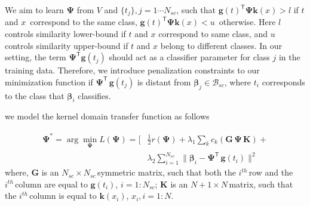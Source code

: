 We aim to learn  $\mathbf{\Psi}$ from $V$ and $\{t_j\}, j=1 \cdots N_{sc}$, such that $\textbf{g}(t)^\textsf{T} \mathbf{\Psi} \textbf{k}(x) > l$ if ${t}$ and  $x\,$ correspond to the same class, $\textbf{g}(t)^\textsf{T} {\mathbf{\Psi}} \textbf{k}(x) < u\,$ otherwise. Here $l\,$ controls similarity lower-bound if $t$ and $x$ correspond to  same class, and $u$ controls similarity upper-bound if $t$ and $x$ belong to different classes. In our setting, the term   ${\mathbf{\Psi}}^\textsf{T} {\textbf{g}(t_j)}$ should act as a classifier parameter for class $j$ in the training data. Therefore,  we introduce  penalization constraints to our minimization function  if  ${\mathbf{\Psi}}^\textsf{T}\,{\textbf{g}(t_j)}$ is distant from $\boldsymbol{\beta}_j \in \mathcal{B}_{sc}$, where ${t}_i$ corresponds to the class that $\boldsymbol{\beta}_i$ classifies. we model the kernel domain transfer function as follows 
\small
\begin{equation}
\begin{split}
{\mathbf{\Psi}^*}= 
 \arg \min_{{\mathbf{\Psi}}}  L({\mathbf{\Psi}}) = [&\frac{1}{2} r({\mathbf{\Psi}}) + \lambda_1 \sum_k c_k(\mathbf{G}\, {\mathbf{\Psi}}\, \mathbf{K}) + \\ & \lambda_2 \sum_{i=1}^{N_{sc}}{\|\boldsymbol{ \beta}_i - {\mathbf{\Psi}}^\textsf{T}\,{\textbf{g}(t_i)}\|^2} 
  \end{split}
  \label{Eq:DA1}
\end{equation}
\normalsize
 where, 
\small$\mathbf{G}\,\,$\normalsize is an \small$N_{sc} \times N_{sc}\,$\normalsize symmetric matrix, such that both the \small$i^{th}\,$\normalsize   row and the \small$i^{th}\,$\normalsize column are equal to \small$\textbf{g}(t_i)$\normalsize, \small$i=1: N_{sc}$\normalsize; \small$\mathbf{K}\,\,$\normalsize  is an \small$N+1 \times N\,$\normalsize matrix, such that the \small$i^{th}\,$\normalsize column is equal to \small$\textbf{k}(x_i)$\normalsize, \small$x_i, i=1:N$\normalsize.
